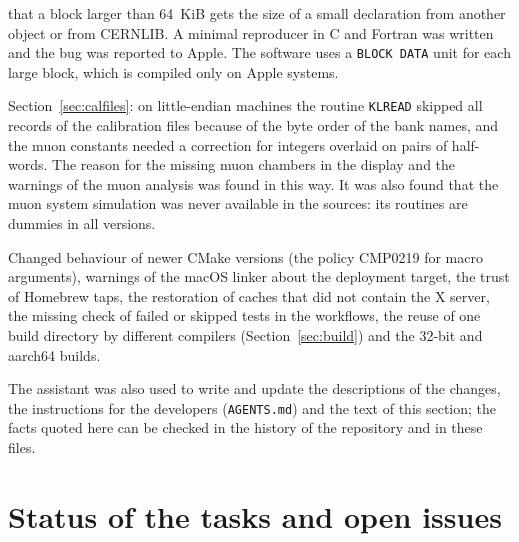 \begin{description}
that a block larger than 64~KiB gets the size of a small declaration from another object or from CERNLIB.
A minimal reproducer in C and Fortran was written and the bug was reported to Apple. The software uses a
\texttt{BLOCK DATA} unit for each large block, which is compiled only on Apple systems.
\item[Calibration constants that were not applied.] Section~\ref{sec:calfiles}: on little-endian machines the
routine \texttt{KLREAD} skipped all records of the calibration files because of the byte order of the bank
names, and the muon constants needed a correction for integers overlaid on pairs of half-words. The reason
for the missing muon chambers in the display and the warnings of the muon analysis was found in this way. It was
also found that the muon system simulation was never available in the sources: its routines are dummies in all versions.
\item[Build system and continuous integration.] Changed behaviour of newer CMake versions (the policy
CMP0219 for macro arguments), warnings of the macOS linker about the deployment target, the trust of
Homebrew taps, the restoration of caches that did not contain the X server, the missing check of failed or
skipped tests in the workflows, the reuse of one build directory by different compilers
(Section~\ref{sec:build}) and the 32-bit and aarch64 builds.
\end{description}
The assistant was also used to write and update the descriptions of the changes, the instructions for the
developers (\texttt{AGENTS.md}) and the text of this section; the facts quoted here can be checked in the
history of the repository and in these files.

\section{Status of the tasks and open issues}
\label{sec:status}

